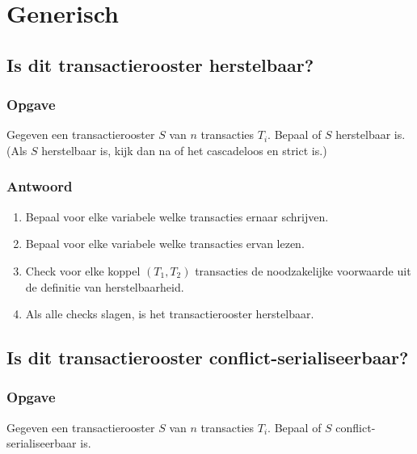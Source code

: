\documentclass[transacties.tex]{subfiles}
\begin{document}
\chapter{Generisch}
\renewcommand\thesection{V\arabic{section}}
\renewcommand\thesubsection{V\arabic{section}}


\section{Is dit transactierooster herstelbaar?}
\subsection*{Opgave}
Gegeven een transactierooster $S$ van $n$ transacties $T_i$. Bepaal of $S$ herstelbaar is. (Als $S$ herstelbaar is, kijk dan na of het cascadeloos en strict is.)
\subsection*{Antwoord}
\begin{enumerate}
\item Bepaal voor elke variabele welke transacties ernaar schrijven.
\item Bepaal voor elke variabele welke transacties ervan lezen.
\item Check voor elke koppel $(T_1,T_2)$ transacties de noodzakelijke voorwaarde uit de definitie van herstelbaarheid.
\item Als alle checks slagen, is het transactierooster herstelbaar.
\end{enumerate}

\section{Is dit transactierooster conflict-serialiseerbaar?}
\subsection*{Opgave}
Gegeven een transactierooster $S$ van $n$ transacties $T_i$. Bepaal of $S$ conflict-serialiseerbaar is.
\end{document}
